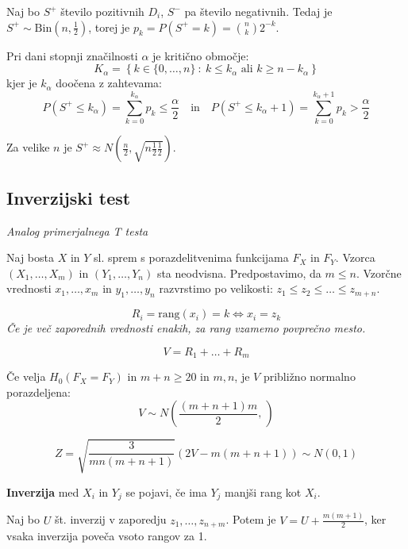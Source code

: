 \begin{multicols}{5}
Naj bo $S^+$ število pozitivnih $D_i$, $S^-$ pa število negativnih. Tedaj je $S^+ \sim \text{Bin}(n, \frac{1}{2})$, torej je $p_k = P(S^+ = k) = \binom{n}{k}2^{-k}$.

Pri dani stopnji značilnosti $\alpha$ je kritično območje:
\[ K_\alpha = \left\{ k \in \{0, \dots, n\} \ :\ k \leq k_\alpha \text{ ali } k \geq n - k_\alpha \right\}\]
kjer je $k_\alpha$ doočena z zahtevama:
{\small
\[P(S^+ \leq k_\alpha) = \sum_{k=0}^{k_\alpha} p_k \leq \frac{\alpha}{2} \quad \text{in} \quad P(S^+ \leq k_\alpha + 1) = \sum_{k=0}^{k_\alpha + 1} p_k > \frac{\alpha}{2} \]
}

Za velike $n$ je $S^+ \approx N(\frac{n}{2}, \sqrt{n\frac{1}{2}\frac{1}{2}})$.

\subsection{Inverzijski test}
\textit{Analog primerjalnega T testa}

Naj bosta $X$ in $Y$ sl. sprem s porazdelitvenima funkcijama $F_X$ in $F_Y$. Vzorca $(X_1, \dots, X_m)$ in $(Y_1, \dots, Y_n)$ sta neodvisna. Predpostavimo, da $m \leq n$.
Vzorčne vrednosti $x_1, \dots, x_m$ in $y_1, \dots, y_n$ razvrstimo po velikosti: $z_1 \leq z_2 \leq \dots \leq z_{m+n}$.

\[ R_i = \text{rang}(x_i) = k \iff  x_i = z_k \]
\textit{Če je več zaporednih vrednosti enakih, za rang vzamemo povprečno mesto.}

\[ V = R_1 + \dots + R_m \]

Če velja $H_0(F_X = F_Y)$ in $m+n \geq 20$ in $m,n$, je $V$ približno normalno porazdeljena:
\[ V \sim N\left( \frac{(m+n+1)m}{2}, \frac{}{} \right)\]

\[ Z = \sqrt{\frac{3}{mn(m+n+1)}} (2V - m(m+n+1)) \sim N(0,1) \]

\textbf{Inverzija} med $X_i$ in $Y_j$ se pojavi, če ima $Y_j$ manjši rang kot $X_i$.

Naj bo $U$ št. inverzij v zaporedju $z_1, \dots, z_{n+m}$. Potem je $V = U + \frac{m(m+1)}{2}$, ker vsaka inverzija poveča vsoto rangov za 1.

\end{multicols}
